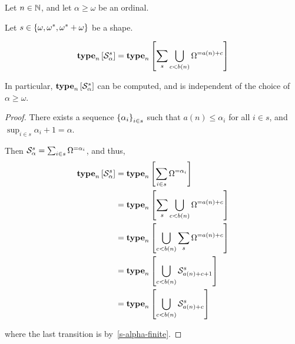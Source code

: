 \begin{corollary}
    Let $n \in \mathbb{N}$, and let $\alpha \ge \omega$ be an ordinal.

    Let $s \in \left\{ {\omega, \omega^\ast, \omega^\ast + \omega} \right\}$ be a shape.

    \[
        \mathbf{type}_{n} \left[ {\mathcal{S}^{s}_{\alpha}} \right]
        = \mathbf{type}_{n} \left[ {\sum_{s} {\bigcup_{c < b(n)}{\Omega^{= a(n) + c}}}} \right]
    \]

    In particular, $\mathbf{type}_{n} \left[ {\mathcal{S}^{s}_{\alpha}} \right]$ can be
    computed, and is independent of the choice of $\alpha \ge \omega$.
\end{corollary}

\begin{proof}
    There exists a sequence $\left\{ {\alpha_i} \right\}_{i \in s}$ such that
    $a(n) \le \alpha_i$ for all $i \in s$,
    and $\sup_{i \in s} {\alpha_i + 1} = \alpha$.

    Then $\mathcal{S}^{s}_{\alpha} = \sum_{i \in s} \Omega^{= \alpha_i}$,
    and thus,
    \begin{align*}
        \mathbf{type}_{n} \left[ {\mathcal{S}^{s}_{\alpha}} \right]
        &= \mathbf{type}_{n} \left[ {\sum_{i \in s} \Omega^{= \alpha_i}} \right] \\
        &= \mathbf{type}_{n} \left[ {\sum_{s} \bigcup_{c < b(n)}{\Omega^{= a(n) + c}}} \right] \\
        &= \mathbf{type}_{n} \left[ {\bigcup_{c < b(n)}{\sum_{s} \Omega^{= a(n) + c}}} \right] \\
        &= \mathbf{type}_{n} \left[ {\bigcup_{c < b(n)}{\mathcal{S}^{s}_{a(n) + c + 1}}} \right] \\
        &= \mathbf{type}_{n} \left[ {\bigcup_{c < b(n)}{\mathcal{S}^{s}_{a(n) + c}}} \right] \\
    \end{align*}

    where the last transition is by~\cref{s-alpha-finite}.

\end{proof}


